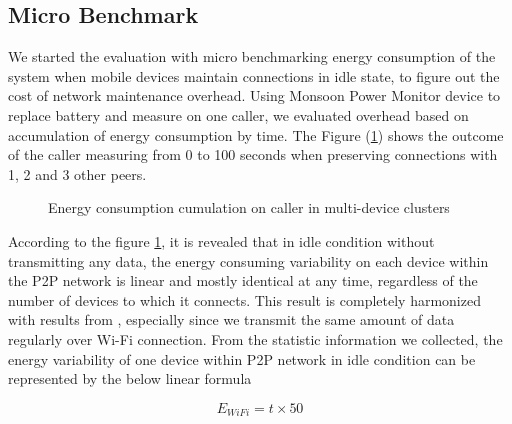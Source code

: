 \documentclass{sig-alternate}[10pt]
\begin{document}
\begin{CCSXML}
\subsection{Micro Benchmark}
We started the evaluation with micro benchmarking energy consumption of the system when mobile devices maintain connections in idle state, to figure out the cost of network maintenance overhead. Using Monsoon Power Monitor device \cite{moosoon} to replace battery and measure on one caller, we evaluated overhead based on accumulation of energy consumption by time. The Figure (\ref{fig:microb_24}) shows the outcome of the caller measuring from 0 to 100 seconds when preserving connections with 1, 2 and 3 other peers. 

\begin{figure}
	\hspace*{-0.15cm}
	\caption{Energy consumption cumulation on caller in multi-device clusters}
	\label{fig:microb_24}
\end{figure}

According to the figure \ref{fig:microb_24}, it is revealed that in idle condition without transmitting any data, the energy consuming variability on each device within the P2P network is linear and mostly identical at any time, regardless of the number of devices to which it connects. This result is completely harmonized with results from \cite{wifi_energy}, especially since we transmit the same amount of data regularly over Wi-Fi connection. From the statistic information we collected, the energy variability of one device within P2P network in idle condition can be represented by the below linear formula

\begin{equation}
\label{eq:wifi_overload}
E_{WiFi} = t \times 50
\end{equation}


\end{CCSXML}
\end{document}
